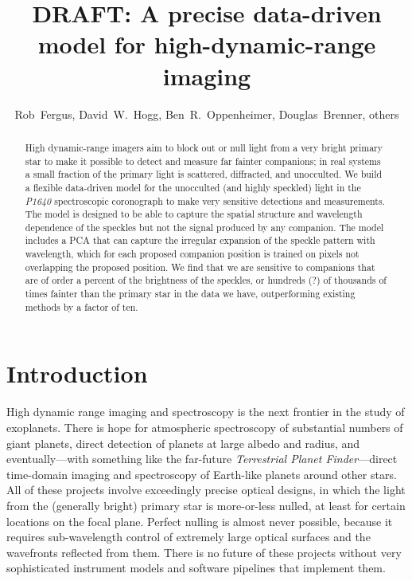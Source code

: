 \documentclass[12pt,pdftex,preprint]{aastex}
\newcommand{\project}[1]{\textsl{#1}}
\begin{document}
\title{DRAFT: A precise data-driven model for high-dynamic-range imaging}

\author{Rob~Fergus,
        David~W.~Hogg,
        Ben~R.~Oppenheimer,
        Douglas~Brenner,
        others}

\begin{abstract}
High dynamic-range imagers aim to block out or null light from a very
bright primary star to make it possible to detect and measure far
fainter companions; in real systems a small fraction of the primary
light is scattered, diffracted, and unocculted.  We build a flexible
data-driven model for the unocculted (and highly speckled) light in
the \project{P1640} spectroscopic coronograph to make very sensitive
detections and measurements.  The model is designed to be able to
capture the spatial structure and wavelength dependence of the
speckles but not the signal produced by any companion.  The model
includes a PCA that can capture the irregular expansion of the speckle
pattern with wavelength, which for each proposed companion position is
trained on pixels not overlapping the proposed position.  We find that
we are sensitive to companions that are of order a percent of the
brightness of the speckles, or hundreds (?) of thousands of times
fainter than the primary star in the data we have, outperforming
existing methods by a factor of ten.
\end{abstract}

\section{Introduction}

High dynamic range imaging and spectroscopy is the next frontier in
the study of exoplanets.  There is hope for atmospheric spectroscopy
of substantial numbers of giant planets, direct detection of planets
at large albedo and radius, and eventually---with something like the
far-future \project{Terrestrial Planet Finder}---direct time-domain
imaging and spectroscopy of Earth-like planets around other stars.
All of these projects involve exceedingly precise optical designs, in
which the light from the (generally bright) primary star is
more-or-less nulled, at least for certain locations on the focal
plane.  Perfect nulling is almost never possible, because it requires
sub-wavelength control of extremely large optical surfaces and the
wavefronts reflected from them.  There is no future of these projects
without very sophisticated instrument models and software pipelines
that implement them.
\end{document}
